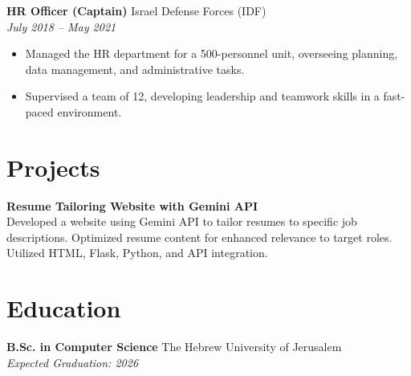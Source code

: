 \documentclass[a4paper,10pt]{article}
\begin{document}
\textbf{HR Officer (Captain)} \hfill Israel Defense Forces (IDF) \\
\textit{July 2018 -- May 2021}
\begin{itemize}[noitemsep,nolistsep]
    \item Managed the HR department for a 500-personnel unit, overseeing planning, data management, and administrative tasks.
    \item Supervised a team of 12, developing leadership and teamwork skills in a fast-paced environment.
\end{itemize}

\section*{Projects}
\textbf{Resume Tailoring Website with Gemini API} \\
Developed a website using Gemini API to tailor resumes to specific job descriptions. Optimized resume content for enhanced relevance to target roles. Utilized HTML, Flask, Python, and API integration.

\section*{Education}
\textbf{B.Sc. in Computer Science} \hfill The Hebrew University of Jerusalem \\
\textit{Expected Graduation: 2026}
\end{document}
